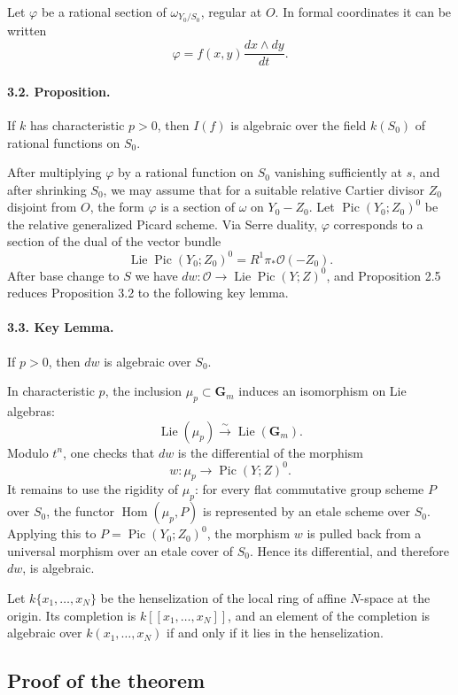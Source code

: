 \documentclass[11pt]{article}
\theoremstyle{remark}
\DeclareMathOperator{\Lie}{Lie}
\DeclareMathOperator{\Pic}{Pic}
\DeclareMathOperator{\Hom}{Hom}
\newcommand{\OO}{\mathcal O}
\newcommand{\Gm}{\mathbf G_m}
\begin{document}
Let $\varphi$ be a rational section of $\omega_{Y_0/S_0}$, regular at $O$. In formal coordinates it can be written
\[
 \varphi=f(x,y)\frac{dx\wedge dy}{dt}.
\]

\paragraph{3.2. Proposition.}
If $k$ has characteristic $p>0$, then $I(f)$ is algebraic over the field $k(S_0)$ of rational functions on $S_0$.

After multiplying $\varphi$ by a rational function on $S_0$ vanishing sufficiently at $s$, and after shrinking $S_0$, we may assume that for a suitable relative Cartier divisor $Z_0$ disjoint from $O$, the form $\varphi$ is a section of $\omega$ on $Y_0-Z_0$. Let $\Pic(Y_0;Z_0)^0$ be the relative generalized Picard scheme. Via Serre duality, $\varphi$ corresponds to a section of the dual of the vector bundle
\[
 \Lie\Pic(Y_0;Z_0)^0=R^1\pi_*\OO(-Z_0).
\]
After base change to $S$ we have $dw:\OO\to\Lie\Pic(Y;Z)^0$, and Proposition 2.5 reduces Proposition 3.2 to the following key lemma.

\paragraph{3.3. Key Lemma.}
If $p>0$, then $dw$ is algebraic over $S_0$.

In characteristic $p$, the inclusion $\mu_p\subset\Gm$ induces an isomorphism on Lie algebras:
\[
 \Lie(\mu_p)\xrightarrow{\sim}\Lie(\Gm).
\]
Modulo $t^n$, one checks that $dw$ is the differential of the morphism
\[
 w:\mu_p\to\Pic(Y;Z)^0.
\]
It remains to use the rigidity of $\mu_p$: for every flat commutative group scheme $P$ over $S_0$, the functor $\Hom(\mu_p,P)$ is represented by an etale scheme over $S_0$. Applying this to $P=\Pic(Y_0;Z_0)^0$, the morphism $w$ is pulled back from a universal morphism over an etale cover of $S_0$. Hence its differential, and therefore $dw$, is algebraic.

Let $k\{x_1,\ldots,x_N\}$ be the henselization of the local ring of affine $N$-space at the origin. Its completion is $k[[x_1,\ldots,x_N]]$, and an element of the completion is algebraic over $k(x_1,\ldots,x_N)$ if and only if it lies in the henselization.

\subsection*{Proof of the theorem}
\end{document}
